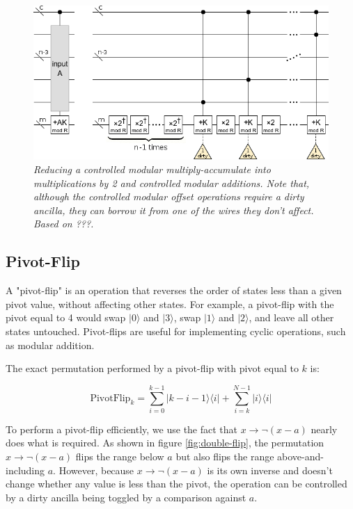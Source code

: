 \documentclass[twocolumn]{article}
\begin{document}
\begin{figure}
  \centering
  \includegraphics[width=\linewidth]{assets/controlled-modular-multiply-accumulate.png}
  \caption{\em
    Reducing a controlled modular multiply-accumulate into multiplications by 2 and controlled modular additions.
    Note that, although the controlled modular offset operations require a dirty ancilla, they can borrow it from one of the wires they don't affect.
    Based on ???.
  }
  \label{fig:controlled-modular-multiply-accumulate}
\end{figure}

\subsection{Pivot-Flip}

A "pivot-flip" is an operation that reverses the order of states less than a given pivot value, without affecting other states.
For example, a pivot-flip with the pivot equal to 4 would swap $|0\rangle$ and $|3\rangle$, swap $|1\rangle$ and $|2\rangle$, and leave all other states untouched.
Pivot-flips are useful for implementing cyclic operations, such as modular addition.

The exact permutation performed by a pivot-flip with pivot equal to $k$ is:

$$\text{PivotFlip}_k = \sum_{i=0}^{k-1} |k-i-1\rangle \langle i| + \sum_{i=k}^{N-1} |i\rangle \langle i|$$

To perform a pivot-flip efficiently, we use the fact that $x \rightarrow \lnot(x - a)$ nearly does what is required.
As shown in figure \ref{fig:double-flip}, the permutation $x \rightarrow \lnot(x - a)$ flips the range below $a$ but also flips the range above-and-including $a$.
However, because $x \rightarrow \lnot(x - a)$ is its own inverse and doesn't change whether any value is less than the pivot, the operation can be controlled by a dirty ancilla being toggled by a comparison against $a$.
\end{document}
